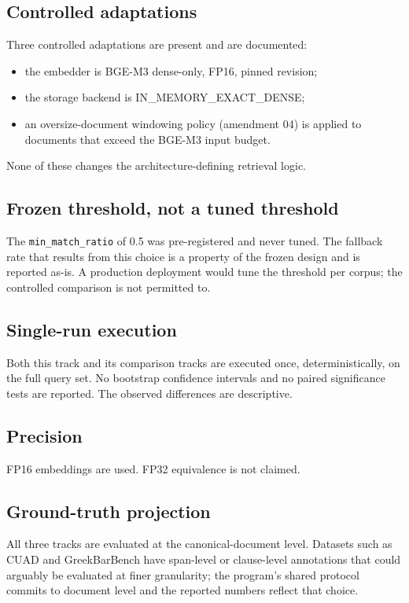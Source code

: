 \documentclass[11pt,a4paper]{article}
\begin{document}
\subsection{Controlled adaptations}
Three controlled adaptations are present and are documented:
\begin{itemize}[leftmargin=1.5em,itemsep=0.15em]
  \item the embedder is BGE-M3 dense-only, FP16, pinned revision;
  \item the storage backend is IN\_MEMORY\_EXACT\_DENSE;
  \item an oversize-document windowing policy (amendment 04) is
    applied to documents that exceed the BGE-M3 input budget.
\end{itemize}
None of these changes the architecture-defining retrieval logic.

\subsection{Frozen threshold, not a tuned threshold}
The \texttt{min\_match\_ratio} of \num{0.5} was pre-registered and
never tuned. The fallback rate that results from this choice is a
property of the frozen design and is reported as-is. A production
deployment would tune the threshold per corpus; the controlled
comparison is not permitted to.

\subsection{Single-run execution}
Both this track and its comparison tracks are executed once,
deterministically, on the full query set. No bootstrap confidence
intervals and no paired significance tests are reported. The
observed differences are descriptive.

\subsection{Precision}
FP16 embeddings are used. FP32 equivalence is not claimed.

\subsection{Ground-truth projection}
All three tracks are evaluated at the canonical-document level.
Datasets such as CUAD and GreekBarBench have span-level or
clause-level annotations that could arguably be evaluated at finer
granularity; the program's shared protocol commits to document level
and the reported numbers reflect that choice.
\end{document}
